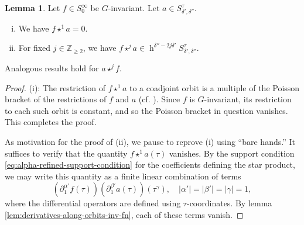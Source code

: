 \documentclass[reqno]{amsart}
\DeclareMathOperator{\h}{h}
\theoremstyle{plain} \newtheorem{theorem} {Theorem}
\theoremstyle{definition} \newtheorem{definition} [theorem] {Definition}
\theoremstyle{itplain} %
\newtheorem{lemma}[theorem]{Lemma}
\numberwithin{equation}{section}
\numberwithin{theorem}{section}
\renewcommand{\geq}{\geqslant}
\begin{document}
\begin{lemma}\label{lem:star-j-against-invariant-function}
  Let $f \in S_0^\infty$ be $G$-invariant.  Let $a \in S^\tau_{\delta ', \delta ''}$.
  \begin{enumerate}[(i)]
  \item We have $f \star^1 a = 0$.
  \item For fixed $j \in \mathbb{Z}_{\geq 2}$, we have $f \star^j a \in \h^{\delta '' - 2 j \delta '} S_{\delta ', \delta ''}^\tau$.
  \end{enumerate}
  Analogous results hold for $a \star^j f$.
\end{lemma}
\begin{proof}
  (i): The restriction of $f \star^1 a$ to a coadjoint orbit is a multiple of the Poisson bracket of the restrictions of $f$ and $a$ (cf. \cite{gutt1983explicit}).  Since $f$ is $G$-invariant, its restriction to each such orbit is constant, and so the Poisson bracket in question vanishes.  This completes the proof.

  As motivation for the proof of (ii), we pause to reprove (i) using ``bare hands.''  It suffices to verify that the quantity $f \star^1 a(\tau)$ vanishes.  By the support condition \eqref{eq:alpha-refined-support-condition} for the coefficients defining the star product, we may write this quantity as a finite linear combination of terms
  \[
    \left( \partial_1^{\alpha '} f(\tau) \right) \left( \partial_1^{\beta '} a(\tau) \right) \left( \tau^\gamma \right), \quad |\alpha '| = |\beta '| = |\gamma| = 1,
  \]
  where the differential operators are defined using $\tau$-coordinates.  By lemma \ref{lem:derivatives-along-orbits-inv-fn}, each of these terms vanish.


\end{proof}
\end{document}
